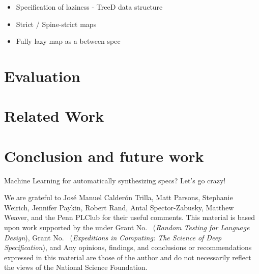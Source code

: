 \documentclass[acmsmall,review]{acmart}\settopmatter{}
\begin{document}
\begin{itemize}
\item Specification of laziness - TreeD data structure 
\item Strict / Spine-strict maps
\item Fully lazy map as a between spec
\end{itemize}

\section{Evaluation}
\label{sec:eval}

\section{Related Work}
\label{sec:related}


\section{Conclusion and future work}
\label{sec:concl}

Machine Learning for automatically synthesizing specs? Let's go crazy!

\begin{acks}                            %
We are grateful to
%
José Manuel Calderón Trilla,
Matt Parsons,
Stephanie Weirich,
Jennifer Paykin,
Robert Rand,
Antal Spector-Zabusky,
Matthew Weaver,
and the Penn PLClub
for their useful comments.
This material is based upon work supported by the
 under Grant
No.~ ({\em Random Testing for Language
Design}), Grant No.~ ({\em Expeditions
in Computing: The Science of Deep Specification}), and  Any opinions, findings, and
conclusions or recommendations expressed in this material are those of
the author and do not necessarily reflect the views of the National
Science Foundation.

\end{acks}

%



%
\end{document}
